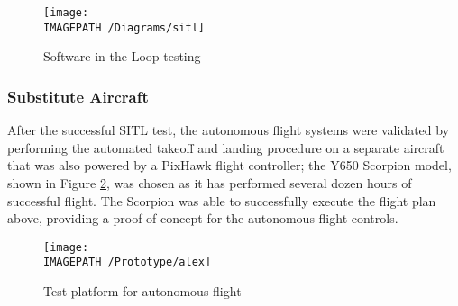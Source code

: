 \begin{figure}[H]
	\centering
	\texttt{[image: \\IMAGEPATH /Diagrams/sitl]}
	\caption{Software in the Loop testing}
	\label{fig:sitl}
\end{figure}

\subsubsection*{Substitute Aircraft}
After the successful SITL test, the autonomous flight systems were validated by performing the automated takeoff and landing procedure on a separate aircraft that was also powered by a PixHawk flight controller; the Y650 Scorpion model, shown in Figure \ref{fig:alex}, was chosen as it has performed several dozen hours of successful flight. The Scorpion was able to successfully execute the flight plan above, providing a proof-of-concept for the autonomous flight controls.

\begin{figure}[H]
	\centering
	\texttt{[image: \\IMAGEPATH /Prototype/alex]}
 	\caption{Test platform for autonomous flight}
 	\label{fig:alex}
\end{figure}